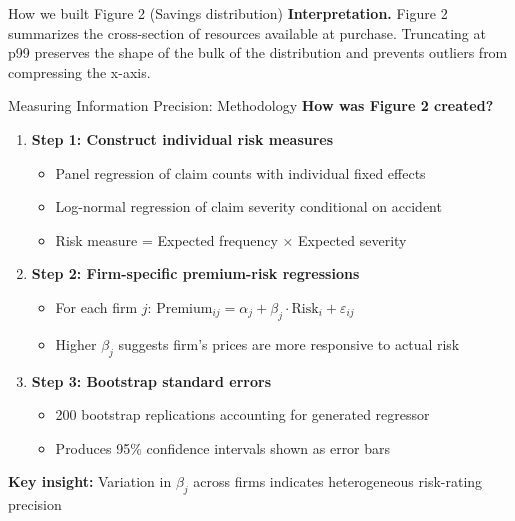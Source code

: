 \documentclass[10pt,aspectratio=169]{beamer}
\begin{document}
\begin{frame}{How we built Figure 2 (Savings distribution)}
\vspace{0.6em}
\textbf{Interpretation.} Figure 2 summarizes the cross-section of resources available at purchase. Truncating at p99 preserves the shape of the bulk of the distribution and prevents outliers from compressing the x-axis.
\end{frame}


\begin{frame}{Measuring Information Precision: Methodology}
\justifying
\textbf{How was Figure 2 created?}
\begin{enumerate}
\item \textbf{Step 1: Construct individual risk measures}
\begin{itemize}
\item Panel regression of claim counts with individual fixed effects
\item Log-normal regression of claim severity conditional on accident
\item Risk measure = Expected frequency × Expected severity
\end{itemize}
\item \textbf{Step 2: Firm-specific premium-risk regressions}
\begin{itemize}
\item For each firm $j$: $\text{Premium}_{ij} = \alpha_j + \beta_j \cdot \text{Risk}_i + \varepsilon_{ij}$
\item Higher $\beta_j$ suggests firm's prices are more responsive to actual risk
\end{itemize}
\item \textbf{Step 3: Bootstrap standard errors}
\begin{itemize}
\item 200 bootstrap replications accounting for generated regressor
\item Produces 95\% confidence intervals shown as error bars
\end{itemize}
\end{enumerate}
\vspace{0.5em}
\textbf{Key insight:} Variation in $\beta_j$ across firms indicates heterogeneous risk-rating precision
\end{frame}
\end{document}
